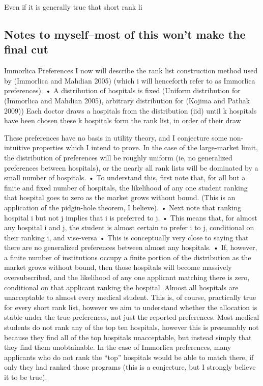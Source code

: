 \documentclass[WP]{AEA}
\begin{document}
Even if it is generally true that short rank li

\subsection{Notes to myself--most of this won't make the final cut}
Immorlica Preferences
I now will describe the rank list construction method used by (Immorlica and Mahdian 2005) (which i will henceforth refer to as Immorlica preferences). 
•	A distribution of hospitals is fixed (Uniform distribution for (Immorlica and Mahdian 2005), arbitrary distribution for (Kojima and Pathak 2009))
Each doctor draws a hospitals from the distribution (iid) until k hospitals have been chosen
these k hospitals form the rank list, in order of their draw

These preferences have no basis in utility theory, and I conjecture some non-intuitive properties which I intend to prove.	
In the case of the large-market limit, the distribution of preferences will be roughly uniform (ie, no generalized preferences between hospitals), or the nearly all rank lists will be dominated by a small number of hospitals.
•	To understand this, first note that, for all but a finite and fixed number of hospitals, the likelihood of any one student ranking that hospital goes to zero as the market grows without bound. (This is an application of the pidgin-hole theorem, I believe).
•	Next note that ranking hospital i but not j implies that i is preferred to j.  
•	This means that, for almost any hospital i and j, the student is almost certain to prefer i to j, conditional on their ranking i, and vise-versa
•	This is conceptually very close to saying that there are no generalized preferences between almost any hospitals.
•	If, however, a finite number of institutions occupy a finite portion of the distribution as the market grows without bound, then those hospitals will become massively oversubscribed, and the likelihood of any one applicant matching there is zero, conditional on that applicant ranking the hospital.
Almost all hospitals are unacceptable to almost every medical student.  This is, of course, practically true for every short rank list, however we aim to understand whether the allocation is stable under the true preferences, not just the reported preferences.  Most medical students do not rank any of the top ten hospitals, however this is presumably not because they find all of the top hospitals unacceptable, but instead simply that they find them unobtainable.  In the case of Immorlica preferences, many applicants who do not rank the “top” hospitals would be able to match there, if only they had ranked those programs (this is a conjecture, but I strongly believe it to be true).
\end{document}
